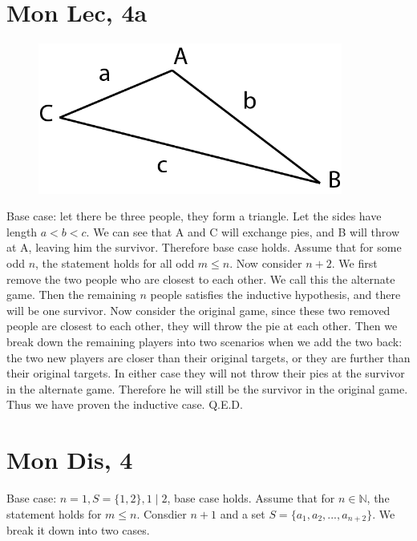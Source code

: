 \documentclass[12pt]{article}
\newcommand{\N}{\mathbb{N}}
\begin{document}
\section{Mon Lec, 4a}
\begin{figure}[h]
    \includegraphics[width = 100mm]{GRAPH1.png}
\end{figure}
Base case: let there be three people, they form a triangle. Let the sides have length $a<b<c$. We can see that A and C will exchange pies, and B will throw at A, leaving him the survivor. Therefore base case holds.
\newline
Assume that for some odd $n$, the statement holds for all odd $m \leq n$. Now consider $n+2$.
\newline
We first remove the two people who are closest to each other. We call this the alternate game. Then the remaining $n$ people satisfies the inductive hypothesis, and there will be one survivor. Now consider the original game, since these two removed people are closest to each other, they will throw the pie at each other.
\newline
Then we break down the remaining players into two scenarios when we add the two back: the two new players are closer than their original targets, or they are further than their original targets.
\newline
In either case they will not throw their pies at the survivor in the alternate game. Therefore he will still be the survivor in the original game.
\newline
Thus we have proven the inductive case. Q.E.D.
\newpage

\section{Mon Dis, 4}
Base case: $n = 1, S = \{1,2\}, 1 \mid 2$, base case holds.
\newline
Assume that for $n \in \N$, the statement holds for $m \leq n$. Consdier $n+1$ and a set $S = \{a_1, a_2, ..., a_{n+2}\}$. We break it down into two cases.
\end{document}
